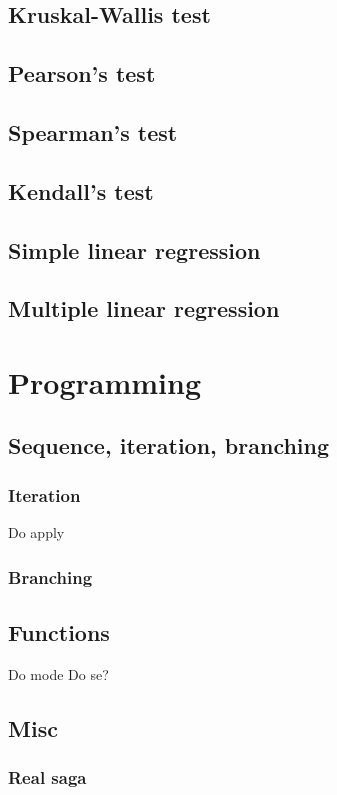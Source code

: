 \documentclass{report}
\begin{document}
	\section{Kruskal-Wallis test}
	\section{Pearson’s test}
	\section{Spearman’s test}
	\section{Kendall’s test}
	\section{Simple linear regression}
	\section{Multiple linear regression}

\chapter{Programming}
	\section{Sequence, iteration, branching}
		\subsection{Iteration}\label{subsec:iteration}
		Do apply
		
		\subsection{Branching}\label{subsec:branching}
	\section{Functions}\label{sec:functions}
	Do mode
	Do se?
	
	\section{Misc}
		\subsection{Real saga}
\end{document}
